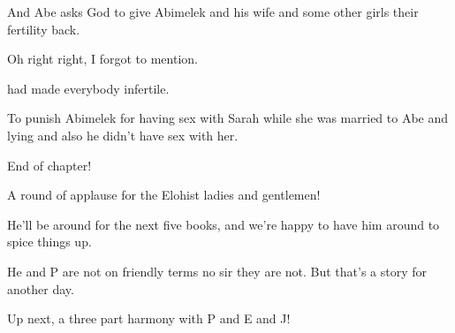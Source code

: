 {
}
{
}
{
	And Abe asks God to give Abimelek and his wife and some other girls their fertility back.

}

{
}
{
}
{
	Oh right right, I forgot to mention.

	 had made everybody infertile.

	To punish Abimelek for having sex with Sarah while she was married to Abe and lying and also he didn't have sex with her.

	End of chapter!

	A round of applause for the Elohist ladies and gentlemen!

	He'll be around for the next five books, and we're happy to have him around to spice things up.

	He and P are not on friendly terms no sir they are not. But that's a story for another day.

	Up next, a three part harmony with P and E and J!
}
